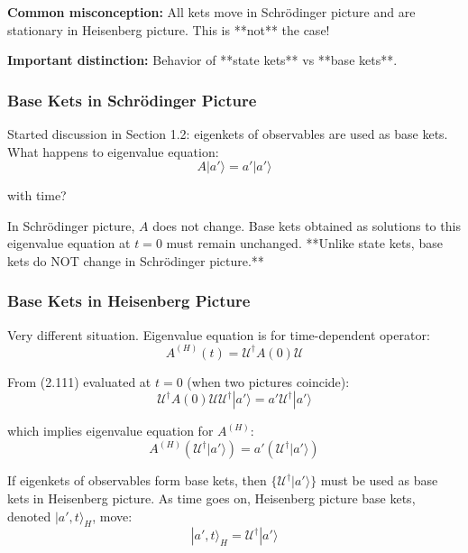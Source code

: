 \documentclass[11pt,a4paper]{article}
\begin{document}
\textbf{Common misconception:} All kets move in Schrödinger picture and are stationary in Heisenberg picture. This is **not** the case!

\textbf{Important distinction:} Behavior of **state kets** vs **base kets**.

\subsubsection{Base Kets in Schrödinger Picture}

Started discussion in Section 1.2: eigenkets of observables are used as base kets. What happens to eigenvalue equation:
\begin{equation}
A|a'\rangle = a'|a'\rangle
\tag{2.111}
\end{equation}

with time?

In Schrödinger picture, $A$ does not change. Base kets obtained as solutions to this eigenvalue equation at $t = 0$ must remain unchanged. **Unlike state kets, base kets do NOT change in Schrödinger picture.**

\subsubsection{Base Kets in Heisenberg Picture}

Very different situation. Eigenvalue equation is for time-dependent operator:
\begin{equation}
A^{(H)}(t) = \mathscr{U}^\dagger A(0)\mathscr{U}
\tag{2.112}
\end{equation}

From (2.111) evaluated at $t = 0$ (when two pictures coincide):
\begin{equation}
\mathscr{U}^\dagger A(0)\mathscr{U}\mathscr{U}^\dagger|a'\rangle = a'\mathscr{U}^\dagger|a'\rangle
\tag{2.113}
\end{equation}

which implies eigenvalue equation for $A^{(H)}$:
\begin{equation}
A^{(H)}(\mathscr{U}^\dagger|a'\rangle) = a'(\mathscr{U}^\dagger|a'\rangle)
\tag{2.114}
\end{equation}

If eigenkets of observables form base kets, then $\{\mathscr{U}^\dagger|a'\rangle\}$ must be used as base kets in Heisenberg picture. As time goes on, Heisenberg picture base kets, denoted $|a', t\rangle_H$, move:
\begin{equation}
|a', t\rangle_H = \mathscr{U}^\dagger|a'\rangle
\tag{2.115}
\end{equation}
\end{document}
